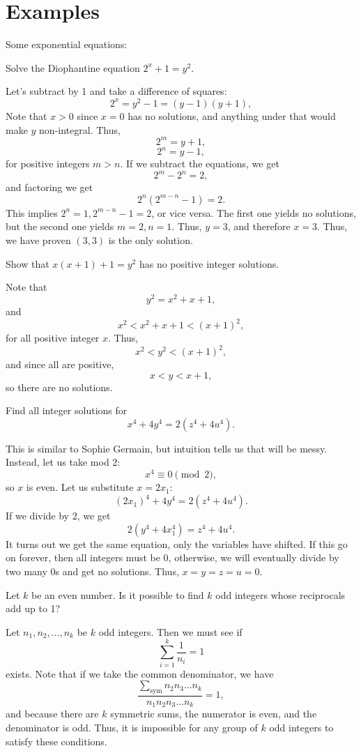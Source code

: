 \documentclass[mast]{lucky}
\begin{document}
\section{Examples}
Some exponential equations:
\begin{exam} 
Solve the Diophantine equation $2^x + 1 = y^2$. 
\end{exam}
\begin{sol}
Let's subtract by 1 and take a difference of squares:
$$2^x = y^2 - 1 = (y-1)(y+1),$$
Note that $x>0$ since $x=0$ has no solutions, and anything under that would make $y$ non-integral. Thus,
$$2^m = y+1,$$
$$2^n = y-1,$$
for positive integers $m>n$. If we subtract the equations, we get
$$2^m - 2^n = 2,$$
and factoring we get
$$2^n (2^{m-n} - 1) = 2.$$
This implies $2^n = 1, 2^{m-n} - 1 = 2$, or vice versa. The first one yields no solutions, but the second one yields $m=2,n=1$. Thus, $y=3$, and therefore $x=3$. Thus, we have proven $(3,3)$ is the only solution.
\end{sol}
\begin{exam}
Show that $x(x+1)+1=y^2$ has no positive integer solutions. 
\end{exam}
\begin{sol}
Note that
$$y^2 = x^2+x+1,$$
and
$$x^2 < x^2+x+1 < (x+1)^2,$$
for all positive integer $x$. Thus,
$$x^2 < y^2 < (x+1)^2,$$
and since all are positive,
$$x < y < x+1,$$
so there are no solutions. 
\end{sol}
\begin{exam}
Find all integer solutions for
$$x^4+4y^4 = 2(z^4+4u^4).$$
\end{exam}
\begin{sol}
This is similar to Sophie Germain, but intuition tells us that will be messy. Instead, let us take mod 2:
$$x^4 \equiv 0 \pmod{2},$$
so $x$ is even. Let us substitute $x=2x_1$:
$$(2x_1)^4 + 4y^4 = 2(z^4 + 4u^4).$$
If we divide by 2, we get
$$2(y^4 + 4x_1^4) = z^4 + 4u^4.$$
It turns out we get the same equation, only the variables have shifted. If this go on forever, then all integers must be 0, otherwise, we will eventually divide by two many 0s and get no solutions. Thus, $x=y=z=u=0$. 
\end{sol}
\begin{exam}
Let $k$ be an even number. Is it possible to find $k$ odd integers whose reciprocals add up to 1?
\end{exam}
\begin{sol}
Let $n_1,n_2,\ldots,n_k$ be $k$ odd integers. Then we must see if
$$\sum_{i=1}^k \frac{1}{n_i} = 1$$
exists. Note that if we take the common denominator, we have
$$\frac{\sum_{\text{sym}} n_2n_3\ldots n_k}{n_1n_2n_3\ldots n_k} = 1,$$
and because there are $k$ symmetric sums, the numerator is even, and the denominator is odd. Thus, it is impossible for any group of $k$ odd integers to satisfy these conditions.
\end{sol}
\end{document}
